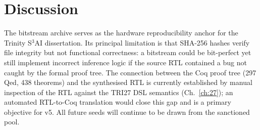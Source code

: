 \section{Discussion}

The bitstream archive serves as the hardware reproducibility anchor for the Trinity S$^3$AI dissertation. Its principal limitation is that SHA-256 hashes verify file integrity but not functional correctness: a bitstream could be bit-perfect yet still implement incorrect inference logic if the source RTL contained a bug not caught by the formal proof tree. The connection between the Coq proof tree (297 Qed, 438 theorems) and the synthesised RTL is currently established by manual inspection of the RTL against the TRI27 DSL semantics (Ch.~\ref{ch:27}); an automated RTL-to-Coq translation would close this gap and is a primary objective for v5. All future seeds will continue to be drawn from the sanctioned pool.
